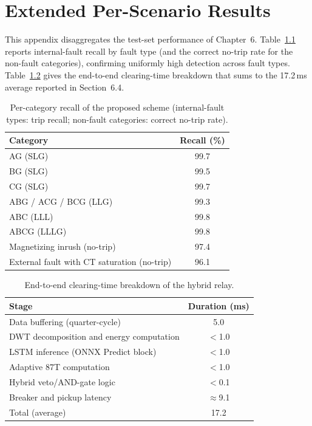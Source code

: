 \documentclass[12pt,a4paper,oneside]{report}
\begin{document}
\chapter{Extended Per-Scenario Results}
This appendix disaggregates the test-set performance of Chapter~6. Table~\ref{tab:E1} reports internal-fault recall by fault type (and the correct no-trip rate for the non-fault categories), confirming uniformly high detection across fault types. Table~\ref{tab:E2} gives the end-to-end clearing-time breakdown that sums to the 17.2\,ms average reported in Section~6.4.
\begin{table}[H]\centering\caption{Per-category recall of the proposed scheme (internal-fault types: trip recall; non-fault categories: correct no-trip rate).}\label{tab:E1}
\begin{tabular}{@{}lc@{}}\toprule \textbf{Category} & \textbf{Recall (\%)}\\ \midrule
AG (SLG) & 99.7\\ BG (SLG) & 99.5\\ CG (SLG) & 99.7\\
ABG / ACG / BCG (LLG) & 99.3\\ ABC (LLL) & 99.8\\ ABCG (LLLG) & 99.8\\
Magnetizing inrush (no-trip) & 97.4\\ External fault with CT saturation (no-trip) & 96.1\\ \bottomrule
\end{tabular}\end{table}
\begin{table}[H]\centering\caption{End-to-end clearing-time breakdown of the hybrid relay.}\label{tab:E2}
\begin{tabular}{@{}lc@{}}\toprule \textbf{Stage} & \textbf{Duration (ms)}\\ \midrule
Data buffering (quarter-cycle) & 5.0\\ DWT decomposition and energy computation & $<$1.0\\
LSTM inference (ONNX Predict block) & $<$1.0\\ Adaptive 87T computation & $<$1.0\\
Hybrid veto/AND-gate logic & $<$0.1\\ Breaker and pickup latency & $\approx$9.1\\ \midrule
Total (average) & 17.2\\ \bottomrule
\end{tabular}\end{table}
\end{document}
